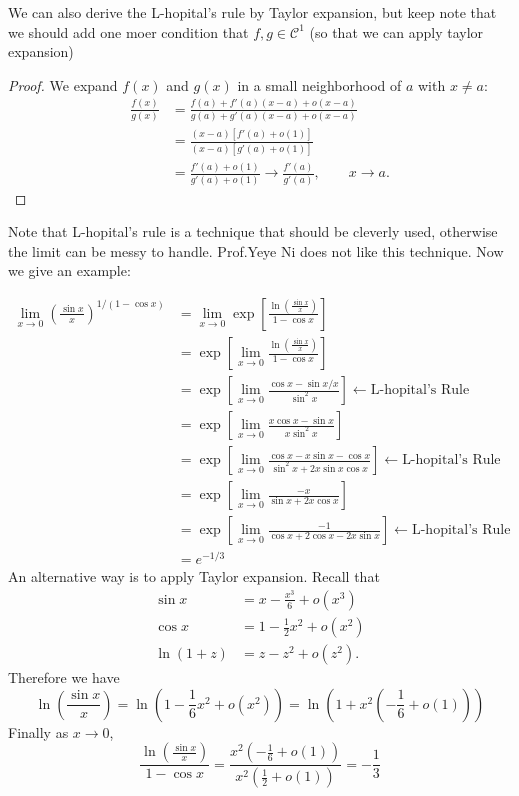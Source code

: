 We can also derive the L-hopital's rule by Taylor expansion, but keep note that we should add one moer condition that $f,g\in\mathcal{C}^1$ (so that we can apply taylor expansion)
\begin{proof}
We expand $f(x)$ and $g(x)$ in a small neighborhood of $a$ with $x\ne a$:
\begin{align*}
\frac{f(x)}{g(x)}&=\frac{f(a)+f'(a)(x-a) + o(x-a)}{g(a) + g'(a)(x-a) + o(x-a)}\\
&=\frac{(x-a)[f'(a)+o(1)]}{(x-a)[g'(a)+o(1)]}\\
&=\frac{f'(a)+o(1)}{g'(a)+o(1)}\to\frac{f'(a)}{g'(a)},\qquad
x\to a.
\end{align*}
\end{proof}
Note that L-hopital's rule is a technique that should be cleverly used, otherwise the limit can be messy to handle. Prof.Yeye Ni does not like this technique. Now we give an example:
\begin{example}
\begin{align*}
\lim_{x\to0}\left(\frac{\sin x}{x}\right)^{1/(1-\cos x)}
&=
\lim_{x\to0}\exp\left[\frac{\ln(\frac{\sin x}{x})}{1-\cos x}\right]\\
&=
\exp\left[\lim_{x\to0}\frac{\ln(\frac{\sin x}{x})}{1-\cos x}\right]\\
&=\exp\left[\lim_{x\to0}\frac{\cos x-\sin x/x}{\sin^2x}\right]\leftarrow\mbox{L-hopital's Rule}\\
&=\exp\left[\lim_{x\to0}\frac{x\cos x-\sin x}{x\sin^2 x}\right]\\
&=\exp\left[\lim_{x\to0}\frac{\cos x-x\sin x-\cos x}{\sin^2x+2x\sin x\cos x}\right]\leftarrow\mbox{L-hopital's Rule}\\
&=\exp\left[\lim_{x\to0}\frac{-x}{\sin x+2x\cos x}\right]\\
&=\exp\left[\lim_{x\to0}\frac{-1}{\cos x+2\cos x-2x\sin x}\right]\leftarrow\mbox{L-hopital's Rule}\\&=e^{-1/3}
\end{align*}
An alternative way is to apply Taylor expansion. Recall that 
\begin{align*}
\sin x&=x-\frac{x^3}{6}+o(x^3)\\
\cos x&=1-\frac{1}{2}x^2+o(x^2)\\
\ln(1+z)&=z-z^2+o(z^2).
\end{align*}
Therefore we have 
\[
\ln(\frac{\sin x}{x})=\ln(1-\frac{1}{6}x^2+o(x^2))
=
\ln(1+x^2(-\frac{1}{6}+o(1)))
\]
Finally as $x\to0$,
\[
\frac{\ln(\frac{\sin x}{x})}{1-\cos x}=\frac{x^2(-\frac{1}{6}+o(1))}{x^2(\frac{1}{2}+o(1))}=-\frac{1}{3}
\]
\end{example}
